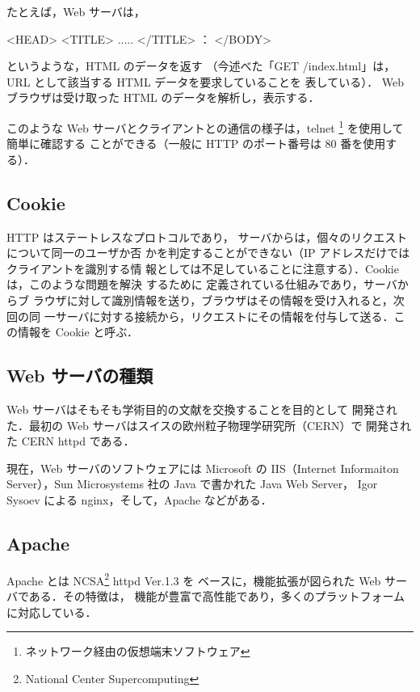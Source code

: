 たとえば，Web サーバは，
\begin{cli}
<HEAD>
<TITLE> ..... </TITLE>
：
</BODY>
\end{cli}
というような，HTML のデータを返す
（今述べた「GET /index.html」は，URL として該当する HTML データを要求していることを
表している）．
Web ブラウザは受け取った HTML のデータを解析し，表示する．

このような Web サーバとクライアントとの通信の様子は，telnet%
\footnote{ネットワーク経由の仮想端末ソフトウェア} %
を使用して簡単に確認する
ことができる（一般に HTTP のポート番号は 80 番を使用する）．


\subsection*{Cookie}
HTTP はステートレスなプロトコルであり，
サーバからは，個々のリクエストについて同一のユーザか否
かを判定することができない（IP アドレスだけではクライアントを識別する情
報としては不足していることに注意する）．Cookie は，このような問題を解決
するために
定義されている仕組みであり，サーバからブ
ラウザに対して識別情報を送り，ブラウザはその情報を受け入れると，次回の同
一サーバに対する接続から，リクエストにその情報を付与して送る．この情報を
Cookie と呼ぶ．


\subsection{Web サーバの種類}
Web サーバはそもそも学術目的の文献を交換することを目的として
開発された．最初の Web サーバはスイスの欧州粒子物理学研究所（CERN）で
開発された CERN httpd である．

現在，Web サーバのソフトウェアには Microsoft の IIS（Internet Informaiton
Server），Sun Microsystems 社の Java で書かれた Java Web Server，
Igor Sysoev による nginx，そして，Apache などがある．

\subsection*{Apache}

Apache とは NCSA\footnote{National Center Supercomputing} httpd Ver.1.3 を
ベースに，機能拡張が図られた Web サーバである．その特徴は，
機能が豊富で高性能であり，多くのプラットフォームに対応している．

